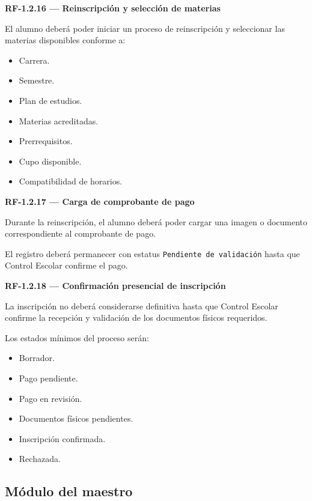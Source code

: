 \documentclass[12pt,a4paper]{article}
\newcommand{\RF}[1]{\textbf{\color{primary}RF-#1}}
\newenvironment{requisito}[1]
{
\begin{center}
\begin{minipage}{0.96\textwidth}
\colorbox{requirement}{
\begin{minipage}{0.94\textwidth}
\textbf{#1}
\end{minipage}
}
\vspace{2mm}
}
{
\end{minipage}
\end{center}
}
\begin{document}
\begin{requisito}{\RF{1.2.16} --- Reinscripción y selección de materias}
El alumno deberá poder iniciar un proceso de reinscripción y seleccionar las
materias disponibles conforme a:

\begin{itemize}[leftmargin=*]
\item Carrera.
\item Semestre.
\item Plan de estudios.
\item Materias acreditadas.
\item Prerrequisitos.
\item Cupo disponible.
\item Compatibilidad de horarios.
\end{itemize}
\end{requisito}

\begin{requisito}{\RF{1.2.17} --- Carga de comprobante de pago}
Durante la reinscripción, el alumno deberá poder cargar una imagen o documento
correspondiente al comprobante de pago.

El registro deberá permanecer con estatus \texttt{Pendiente de validación} hasta
que Control Escolar confirme el pago.
\end{requisito}

\begin{requisito}{\RF{1.2.18} --- Confirmación presencial de inscripción}
La inscripción no deberá considerarse definitiva hasta que Control Escolar
confirme la recepción y validación de los documentos físicos requeridos.

Los estados mínimos del proceso serán:

\begin{itemize}[leftmargin=*]
\item Borrador.
\item Pago pendiente.
\item Pago en revisión.
\item Documentos físicos pendientes.
\item Inscripción confirmada.
\item Rechazada.
\end{itemize}
\end{requisito}

\subsection{Módulo del maestro}
\end{document}
